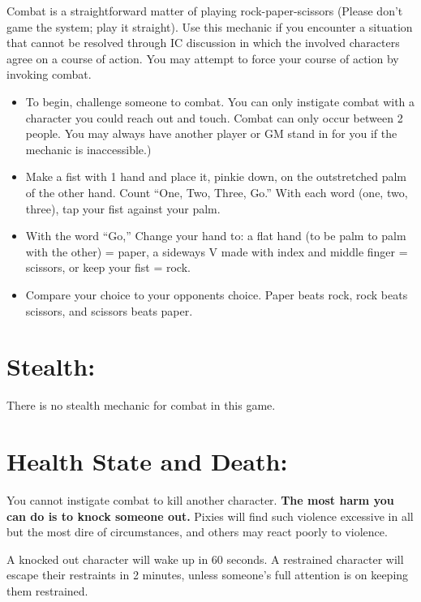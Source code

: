 \documentclass[sheet]{PP}
\begin{document}
Combat is a straightforward matter of playing rock-paper-scissors (Please don't game the system; play it straight). Use this mechanic if you encounter a situation that cannot be resolved through IC discussion in which the involved characters agree on a course of action. You may attempt to force your course of action by invoking combat.

\begin{itemize}
	\item To begin, challenge someone to combat. You can only instigate combat with a character you could reach out and touch. Combat can only occur between 2 people. You may always have another player or GM stand in for you if the mechanic is inaccessible.) 
	\item Make a fist with 1 hand and place it, pinkie down, on the outstretched palm of the other hand. Count ``One, Two, Three, Go.'' With each word (one, two, three), tap your fist against your palm.
	\item With the word ``Go,'' Change your hand to: a flat hand (to be palm to palm with the other) = paper, a sideways V made with index and middle finger = scissors, or keep your fist = rock.
	\item Compare your choice to your opponents choice. Paper beats rock, rock beats scissors, and scissors beats paper.
\end{itemize}

\section*{Stealth:} There is no stealth mechanic for combat in this game.

\section*{Health State and Death:} You cannot instigate combat to kill another character. \textbf{The most harm you can do is to knock someone out.} Pixies will find such violence excessive in all but the most dire of circumstances, and others may react poorly to violence.

A knocked out character will wake up in 60 seconds. A restrained character will escape their restraints in 2 minutes, unless someone's full attention is on keeping them restrained.
\end{document}
